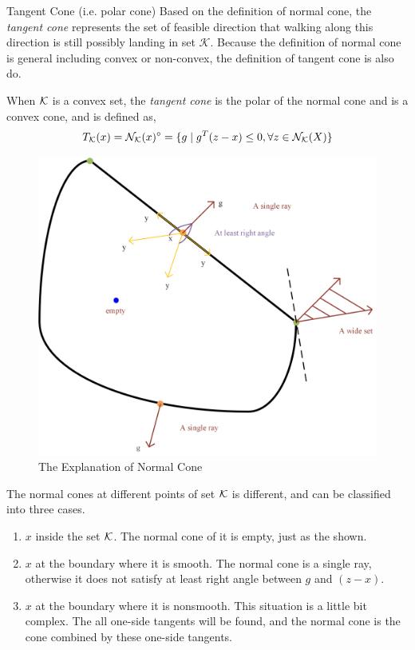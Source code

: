  	 \begin{defn}{Tangent Cone (i.e. polar cone)}{}
 	 	Based on the definition of normal cone, the \emph{tangent cone} represents the set of feasible direction that walking along this direction is still possibly landing in set $\mathcal{K}$. Because the definition of normal cone is general including convex or non-convex, the definition of tangent cone is also do. 
 	 	
 	 	When $\mathcal{K}$ is a convex set, the \emph{tangent cone} is the polar of the normal cone and is a convex cone, and is defined as,
 	 	$$
 	 	T_{\mathcal{K}}(x) = \mathcal{N}_{\mathcal{K}}(x)^{\circ} = \{g\mid g^T(z-x)\le 0,\forall z\in\mathcal{N}_{\mathcal{K}}(X)\}
 	 	$$
 	 \end{defn}
	 \begin{figure}[htbp] \label{normal cone}
	 	\centering
	 	\includegraphics[scale=1]{img/normal_cone.png}
	 	\caption{The Explanation of Normal Cone}
	 \end{figure}
	 The normal cones at different points of set $\mathcal{K}$ is different, and can be classified into three cases.
	 \begin{enumerate}
	 	\item $x$ inside the set $\mathcal{K}$. The normal cone of it is empty, just as the  shown.
	 	\item $x$ at the boundary where it is smooth. The normal cone is a single ray, otherwise it does not satisfy at least right angle between $g$ and $(z-x)$.
	 	\item $x$ at the boundary where it is nonsmooth. This situation is a little bit complex. The all one-side tangents will be found, and the normal cone is the cone combined by these one-side tangents.
	 \end{enumerate}
	 
